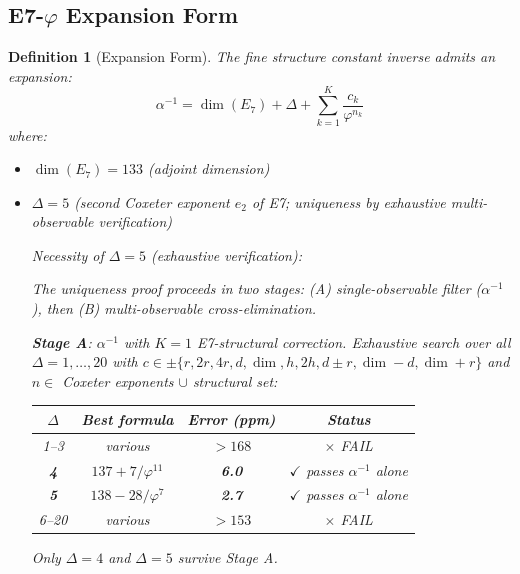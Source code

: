 \documentclass[11pt,a4paper]{article}
\newtheorem{definition}{Definition}
\begin{document}
\subsection{E7-$\varphi$ Expansion Form}

\begin{definition}[Expansion Form]
The fine structure constant inverse admits an expansion:
\begin{equation}
\alpha^{-1} = \dim(E_7) + \Delta + \sum_{k=1}^{K} \frac{c_k}{\varphi^{n_k}}
\end{equation}
where:
\begin{itemize}
\item $\dim(E_7) = 133$ (adjoint dimension)
\item $\Delta = 5$ (second Coxeter exponent $e_2$ of E7; uniqueness by exhaustive multi-observable verification)

\textit{Necessity of $\Delta=5$} (exhaustive verification):

The uniqueness proof proceeds in two stages: (A) single-observable filter ($\alpha^{-1}$), then (B) multi-observable cross-elimination.

\textbf{Stage A}: $\alpha^{-1}$ with $K=1$ E7-structural correction. Exhaustive search over all $\Delta = 1, \ldots, 20$ with $c \in \pm\{r, 2r, 4r, d, \dim, h, 2h, d\pm r, \dim - d, \dim + r\}$ and $n \in$ Coxeter exponents $\cup$ structural set:
\begin{center}
\begin{tabular}{|c|c|c|c|}
\hline
$\Delta$ & Best formula & Error (ppm) & Status \\
\hline
1--3 & various & $> 168$ & {\small $\times$ FAIL} \\
\textbf{4} & $137 + 7/\varphi^{11}$ & \textbf{6.0} & {\small $\checkmark$ passes $\alpha^{-1}$ alone} \\
\textbf{5} & $138 - 28/\varphi^{7}$ & \textbf{2.7} & {\small $\checkmark$ passes $\alpha^{-1}$ alone} \\
6--20 & various & $> 153$ & {\small $\times$ FAIL} \\
\hline
\end{tabular}
\end{center}

Only $\Delta = 4$ and $\Delta = 5$ survive Stage A.


\end{itemize}
\end{definition}
\end{document}
